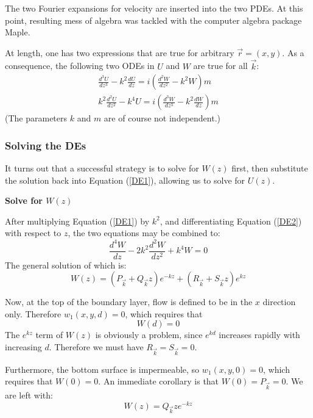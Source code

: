 \documentclass[a4paper]{report}
\begin{document}
The two Fourier expansions for velocity are inserted into the two PDEs.  At this point, resulting mess of algebra was tackled with the computer algebra package Maple.

At length, one has two expressions that are true for arbitrary $\vec{r} = (x,y)$.  As a consequence, the following two ODEs in $U$ and $W$ are true for all $\vec{k}$:
\begin{gather}
\frac{d^3 U}{dz^3} - k^2 \frac{d U}{dz} = i \left( \frac{d^2 W}{dz^2} - k^2 W \right) m 
\label{DE1} \\
k^2 \frac{d^2 U}{dz^2} - k^4 U = i \left( \frac{d^3 W}{dz^3} - k^2 \frac{dW}{dz} \right) m
\label{DE2}
\end{gather}
(The parameters $k$ and $m$ are of course not independent.)

\subsubsection*{Solving the DEs}

It turns out that a successful strategy is to solve for $W(z)$ first, then substitute the solution back into Equation (\ref{DE1}), allowing us to solve for $U(z)$.

\vspace{1em}
\textbf{Solve for $W(z)$}

After multiplying Equation (\ref{DE1}) by $k^2$, and  differentiating  Equation (\ref{DE2}) with respect to $z$, the two equations may be combined to:
\begin{equation}
\frac{d^4 W}{dz} - 2 k^2 \frac{d^2 W}{dz^2} + k^4 W = 0
\end{equation}
The general solution of which is:
\begin{equation}
W(z) = \left( P_{\vec{k}} + Q_{\vec{k}} z \right) e^{-kz} +
\left( R_{\vec{k}} + S_{\vec{k}} z \right) e^{kz}
\end{equation}

Now, at the top of the boundary layer, flow is defined to be in the $x$ direction only.  Therefore $w_1(x,y,d) = 0$, which requires that
\begin{equation}
W(d) = 0
\end{equation} 
The $e^{kz}$ term of $W(z)$ is obviously a problem, since $e^{kd}$ increases rapidly with increasing $d$.  Therefore we must have $R_{\vec{k}} = S_{\vec{k}} = 0$.

Furthermore, the bottom surface is impermeable, so $w_1(x,y,0) = 0$, which requires that $W(0) = 0$.  An immediate corollary is that $W(0) = P_{\vec{k}} = 0$.
We are left with:
\begin{equation}
W(z) = Q_{\vec{k}} z e^{-kz}
\end{equation} 
\end{document}
